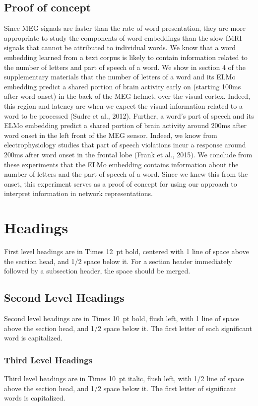 \documentclass{article}
\begin{document}
\subsection{Proof of concept}
Since MEG signals are faster than the rate of word presentation, they are more
appropriate to study the components of word embeddings than the slow fMRI signals that cannot be
attributed to individual words. We know that a word embedding learned from a text corpus is likely to
contain information related to the number of letters and part of speech of a word. We show in section
4 of the supplementary materials that the number of letters of a word and its ELMo embedding
predict a shared portion of brain activity early on (starting 100ms after word onset) in the back of the
MEG helmet, over the visual cortex. Indeed, this region and latency are when we expect the visual
information related to a word to be processed (Sudre et al., 2012). Further, a word’s part of speech
and its ELMo embedding predict a shared portion of brain activity around 200ms after word onset in
the left front of the MEG sensor. Indeed, we know from electrophysiology studies that part of speech
violations incur a response around 200ms after word onset in the frontal lobe (Frank et al., 2015). We
conclude from these experiments that the ELMo embedding contains information about the number
of letters and the part of speech of a word. Since we knew this from the onset, this experiment serves
as a proof of concept for using our approach to interpret information in network representations.


\section{Headings}
First level headings are in Times 12~pt bold, centered with 1 line of space above the section head, and 1/2 space below it.
For a section header immediately followed by a subsection header, the space should be merged.

\subsection{Second Level Headings}
Second level headings are in Times 10~pt bold, flush left, with 1 line of space above the section head, and 1/2 space below it. The first letter of each significant word is capitalized.

\subsubsection{Third Level Headings}
Third level headings are in Times 10~pt italic, flush left, with 1/2 line of space above the section head, and 1/2 space below it. The first letter of significant words is capitalized.
\end{document}
